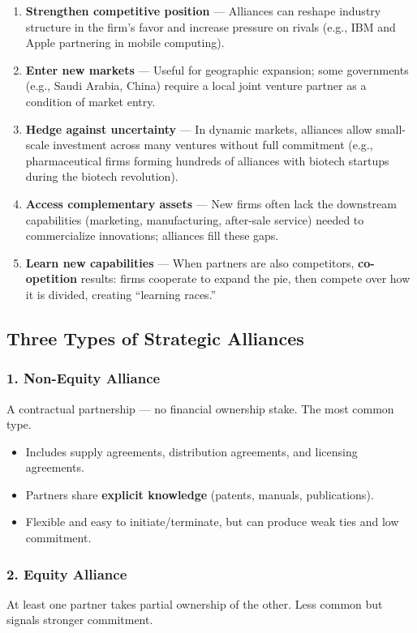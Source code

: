 \documentclass[11pt, letterpaper]{article}
\begin{document}
\begin{enumerate}[leftmargin=*, label=\textbf{\arabic*.}]
  \item \textbf{Strengthen competitive position} --- Alliances can reshape industry structure in the firm's favor and increase pressure on rivals (e.g., IBM and Apple partnering in mobile computing).
  \item \textbf{Enter new markets} --- Useful for geographic expansion; some governments (e.g., Saudi Arabia, China) require a local joint venture partner as a condition of market entry.
  \item \textbf{Hedge against uncertainty} --- In dynamic markets, alliances allow small-scale investment across many ventures without full commitment (e.g., pharmaceutical firms forming hundreds of alliances with biotech startups during the biotech revolution).
  \item \textbf{Access complementary assets} --- New firms often lack the downstream capabilities (marketing, manufacturing, after-sale service) needed to commercialize innovations; alliances fill these gaps.
  \item \textbf{Learn new capabilities} --- When partners are also competitors, \textbf{co-opetition} results: firms cooperate to expand the pie, then compete over how it is divided, creating ``learning races.''
\end{enumerate}

\subsection{Three Types of Strategic Alliances}

\subsubsection{1. Non-Equity Alliance}
A contractual partnership --- no financial ownership stake. The most common type.

\begin{itemize}[leftmargin=*]
  \item Includes supply agreements, distribution agreements, and licensing agreements.
  \item Partners share \textbf{explicit knowledge} (patents, manuals, publications).
  \item Flexible and easy to initiate/terminate, but can produce weak ties and low commitment.
\end{itemize}

\subsubsection{2. Equity Alliance}
At least one partner takes partial ownership of the other. Less common but signals stronger commitment.
\end{document}
